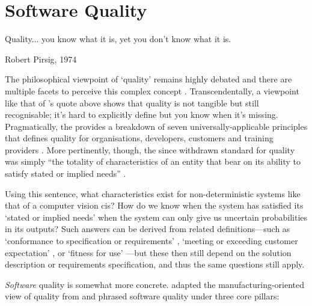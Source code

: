 \section{Software Quality}
\label{sec:literature-review:software-quality}

\epigraph{Quality... you know what it is, yet you don't know what it is.}{Robert Pirsig, 1974 \citep{Pirsig:1974vs}}

\noindent
The philosophical viewpoint of `quality' remains highly debated and there are multiple facets to perceive this complex concept \citep{Garvin:1984vf}. Transcendentally, a viewpoint like that of \citeauthor{Pirsig:1974vs}'s quote above shows that quality is not tangible but still recognisable; it's hard to explicitly define but you know when it's missing. Pragmatically, the \citeauthor{ISO8402:1986} provides a breakdown of seven universally-applicable principles that defines quality for organisations, developers, customers and training providers \citep{ISO9000:2015}. More pertinently, though, the since withdrawn \citeyear{ISO8402:1986} standard for quality was simply ``the totality of characteristics of an entity that bear on its ability to satisfy stated or implied needs'' \citep{ISO8402:1986}.

Using this sentence, what characteristics exist for non-deterministic systems like that of a computer vision \gls{cis}? How do we know when the system has satisfied its `stated or implied needs' when the system can only give us uncertain probabilities in its outputs? Such answers can be derived from related definitions---such as `conformance to specification or requirements' \citep{Gilmore:1974um,Crosby:1979uy}, `meeting or exceeding customer expectation' \citep{Parasuraman:1988wh}, or `fitness for use' \citep{Juran:1988tg}---but these then still depend on the solution description or requirements specification, and thus the same questions still apply.

\textit{Software} quality is somewhat more concrete. \citet{Pressman:2005vf} adapted the manufacturing-oriented view of quality from \citep{Bessin:2004vc} and phrased software quality under three core pillars:

